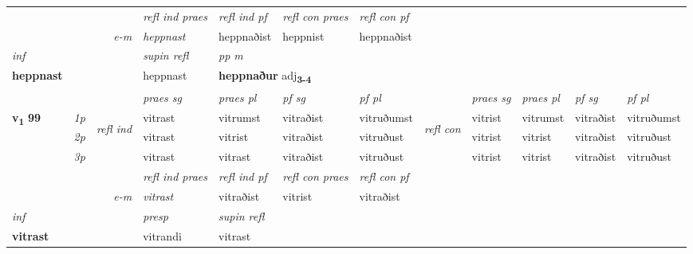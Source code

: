 \begin{longtable}[l]{X>{\footnotesize\itshape}llXXXXlXXXX}
 & && \textit{refl ind praes} & \textit{refl ind pf} & \textit{refl con praes} & \textit{refl con pf} \\*
\multicolumn{3}{r}{\textit{e-m}}& heppnast & heppnaðist & heppnist & heppnaðist \\*

\cmidrule{4-7}
   {\textit{inf}} & &       & \textit{supin refl} & \textit{pp m} \\*
  {\textbf{heppnast}} & &       & heppnast & \multicolumn{2}{l}{\textbf{heppnaður} adj\textbf{\textsubscript{3-4}}} \\*

\midrule

 & &   & \textit{praes sg}  & \textit{praes pl}    & \textit{ pf sg} & \textit{pf pl} & & \textit{praes sg}  & \textit{praes pl}    & \textit{pf sg} & \textit{pf pl }  \\ \cmidrule{4-7} \cmidrule{9-12}
 \multirow{2}{*}{{{\textbf{v{\textsubscript{1}}} \Large{\textbf{99}}}}}  & 1p & \multirow{3}{*}{\begin{turn}{90}\textit{refl ind}\end{turn}}  & vitrast & vitrumst & vitraðist & vitruðumst & \multirow{3}{*}{\begin{turn}{90}\textit{refl con}\end{turn}}  &vitrist & vitrumst & vitraðist & vitruðumst \\*
 & 2p &  & vitrast & vitrist & vitraðist & vitruðust & &vitrist & vitrist & vitraðist & vitruðust \\*
 & 3p  & & vitrast & vitrast & vitraðist & vitruðust & & vitrist & vitrist& vitraðist & vitruðust \\*
\cmidrule{4-7} \cmidrule{9-12}

 & && \textit{refl ind praes} & \textit{refl ind pf} & \textit{refl con praes} & \textit{refl con pf} \\*
\multicolumn{3}{r}{\textit{e-m}}& vitrast & vitraðist & vitrist & vitraðist \\*

\cmidrule{4-7}
   {\textit{inf}} & &     & \textit{presp}  & \textit{supin refl}  \\*
  {\textbf{vitrast}} & &     & vitrandi  & vitrast  \\*

\midrule


\end{longtable}

